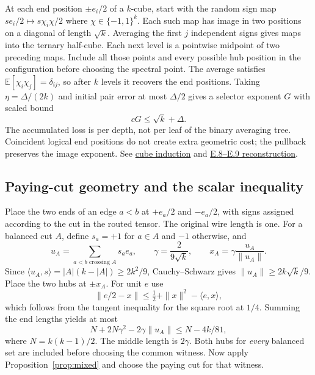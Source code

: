 \documentclass[11pt,letterpaper]{article}
\theoremstyle{definition}\newtheorem{definition}[theorem]{Definition}\newtheorem{example}[theorem]{Example}
\theoremstyle{remark}\newtheorem{remark}[theorem]{Remark}
\newcommand{\pub}[3]{\href{https://github.com/anthropics/formal-math/blob/11b6c7e3c927df2658f513b6b68ea7f8929c62c5/vp-vnp/#1\#L#2}{#3}}
\newcommand{\aud}[2]{\href{https://github.com/nousentllc/VP-VNP-Review/blob/567303d0bcf4f9d54390437b137752446e58ccd6/#1}{#2}}
\begin{document}
At each end position $\pm e_i/2$ of a $k$-cube, start with the random sign map $s e_i/2\mapsto s\chi_i\chi/2$ where $\chi\in\{-1,1\}^k$. Each such map has image in two positions on a diagonal of length $\sqrt k$. Averaging the first $j$ independent signs gives maps into the ternary half-cube. Each next level is a pointwise midpoint of two preceding maps. Include all those points and every possible hub position in the configuration before choosing the spectral point. The average satisfies $\mathbb E[\chi_i\chi_j]=\delta_{ij}$, so after $k$ levels it recovers the end positions. Taking $\eta=\Delta/(2k)$ and initial pair error at most $\Delta/2$ gives a selector exponent $G$ with scaled bound
\begin{equation}\label{eq:selector}
 cG\le \sqrt k+\Delta.
\end{equation}
The accumulated loss is per depth, not per leaf of the binary averaging tree. Coincident logical end positions do not create extra geometric cost; the pullback preserves the image exponent. See \pub{Paper/Convex.lean}{318}{cube induction} and \aud{passes/14a-flat.md}{E.8--E.9 reconstruction}.

\subsection{Paying-cut geometry and the scalar inequality}\label{sec:paying}
Place the two ends of an edge $a<b$ at $+e_a/2$ and $-e_a/2$, with signs assigned according to the cut in the routed tensor. The original wire length is one. For a balanced cut $A$, define $s_a=+1$ for $a\in A$ and $-1$ otherwise, and
\[
 u_A=\sum_{a<b\text{ crossing }A}s_a e_a,\qquad
 \gamma=\frac{2}{9\sqrt k},\qquad x_A=\gamma\frac{u_A}{\|u_A\|}.
\]
Since $\langle u_A,s\rangle=|A|(k-|A|)\ge2k^2/9$, Cauchy--Schwarz gives $\|u_A\|\ge2k\sqrt k/9$. Place the two hubs at $\pm x_A$. For unit $e$ use
\[
 \|e/2-x\|\le\tfrac12+\|x\|^2-\langle e,x\rangle,
\]
which follows from the tangent inequality for the square root at $1/4$. Summing the end lengths yields at most
\[
 N+2N\gamma^2-2\gamma\|u_A\|\le N-4k/81,
\]
where $N=k(k-1)/2$. The middle length is $2\gamma$. Both hubs for \emph{every} balanced set are included before choosing the common witness. Now apply Proposition~\ref{prop:mixed} and choose the paying cut for that witness.
\end{document}
